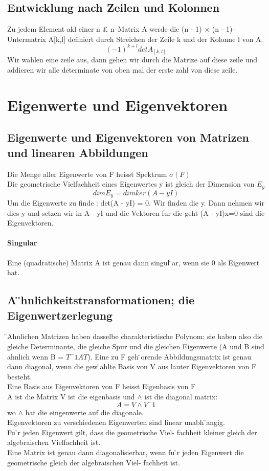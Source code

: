 \documentclass[11pt]{article}
\begin{document}
\subsection{Entwicklung nach Zeilen und Kolonnen}
Zu jedem Element akl einer n £ n–Matrix A werde die (n - 1) $\times$ (n - 1)–Untermatrix A[k,l] definiert durch Streichen der Zeile k und der Kolonne l von A.
\begin{equation}
	(-1)^{k+l}det A_{[k,l]}
\end{equation}
Wir wahlen eine zeile aus, dann gehen wir durch die Matrize auf diese zeile und addieren wir alle determinate von oben mal der erste zahl von diese zeile.
\section{Eigenwerte und Eigenvektoren}
\subsection{Eigenwerte und Eigenvektoren von Matrizen und linearen Abbildungen}
Die Menge aller Eigenwerte von F heisst Spektrum $\sigma(F)$\\
Die geometrische Vielfachheit eines Eigenwertes y ist gleich der Dimension von $E_y$
\begin{equation}
	dim E_y= dim ker(A-yI)
\end{equation}
Um die Eigenwerte zu finde : det(A - yI) = 0. Wir finden die y. Dann nehmen wir dies y und setzen wir in A - yI und die Vektoren fur die geht (A - yI)x=0 sind die Eigenvektoren.
\paragraph{Singular}
Eine (quadratische) Matrix A ist genau dann singul ̈ar, wenn sie 0 als Eigenwert hat.
\subsection{A ̈hnlichkeitstransformationen; die Eigenwertzerlegung}
 ̈Ahnlichen Matrizen haben dasselbe charakteristische Polynom; sie haben also die gleiche Determinante, die gleiche Spur und die gleichen Eigenwerte (A und B sind ahnlich wenn B = $T^-1AT$).
Eine zu F geh ̈orende Abbildungsmatrix ist genau dann diagonal, wenn die gew ̈ahlte Basis von V aus lauter Eigenvektoren von F besteht.\\
Eine Basis aus Eigenvektoren von F heisst Eigenbasis von F\\
A ist die Matrix V ist die eigenbasis und $\wedge$ ist die diagonal matrix:
\begin{equation}
	A = V \wedge V^-1
\end{equation}
wo $\wedge$ hat die eingenwerte auf die diagonale.\\
 Eigenvektoren zu verschiedenen Eigenwerten sind linear unabh ̈angig.\\
 Fu ̈r jeden Eigenwert gilt, dass die geometrische Viel- fachheit kleiner gleich der algebraischen Vielfachheit ist.\\
 Eine Matrix ist genau dann diagonalisierbar, wenn fu ̈r jeden Eigenwert die geometrische gleich der algebraischen Viel- fachheit ist.
\end{document}
